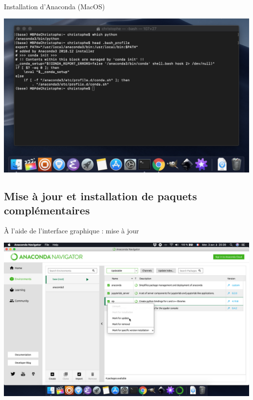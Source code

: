 \documentclass[10pt,aspectratio=169]{beamer}
\begin{document}
\begin{frame}{Installation d'Anaconda (MacOS)}
  \begin{center}
    \includegraphics[height = .8\textheight]{prompt-terminal-macos}
  \end{center}
\end{frame}

\subsection{Mise à jour et installation de paquets complémentaires}

\begin{frame}{À l'aide de l'interface graphique : mise à jour}
  \begin{center}
    \includegraphics[height = .8\textheight]{anaconda-navigator-select-package-for-upgrade}
  \end{center}
\end{frame}
\end{document}
